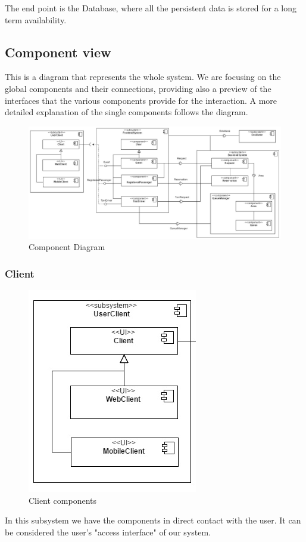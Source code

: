 	The end point is the Database, where all the persistent data is stored for a long term availability.
	\newpage
	\begin{landscape}
	\subsection{Component view}
	This is a diagram that represents the whole system. We are focusing on the global components and their
	connections, providing also a preview of the interfaces that the various components provide for the
	interaction. A more detailed explanation of the single components follows the diagram.
		\begin{figure}[h!]
			\begin{center}
				\includegraphics[width=0.9\linewidth]{../SE2_IMAGES/ComponentDiagram}
				\caption{Component Diagram}
			\end{center}
		\end{figure}
	\end{landscape}
	\newpage
	\subsubsection{Client}
		\begin{figure}[h!]
			\begin{center}
				\includegraphics[scale=1]{../SE2_IMAGES/UserClient}
				\caption{Client components}
			\end{center}
		\end{figure}
		In this subsystem we have the components in direct contact with the user.
		It can be considered the user's "access interface" of our system.

